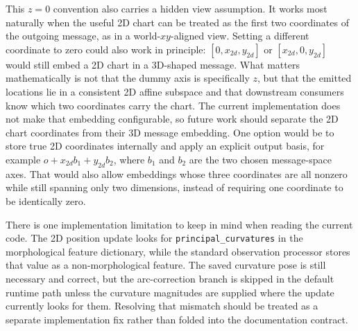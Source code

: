 \documentclass{article}
\begin{document}
This \(z=0\) convention also carries a hidden view assumption.
It works most naturally when the useful 2D chart can be treated as the first two coordinates of the outgoing message, as in a world-\(xy\)-aligned view.
Setting a different coordinate to zero could also work in principle: \([0, x_{2d}, y_{2d}]\) or \([x_{2d}, 0, y_{2d}]\) would still embed a 2D chart in a 3D-shaped message.
What matters mathematically is not that the dummy axis is specifically \(z\), but that the emitted locations lie in a consistent 2D affine subspace and that downstream consumers know which two coordinates carry the chart.
The current implementation does not make that embedding configurable, so future work should separate the 2D chart coordinates from their 3D message embedding.
One option would be to store true 2D coordinates internally and apply an explicit output basis, for example \(o + x_{2d} b_1 + y_{2d} b_2\), where \(b_1\) and \(b_2\) are the two chosen message-space axes.
That would also allow embeddings whose three coordinates are all nonzero while still spanning only two dimensions, instead of requiring one coordinate to be identically zero.

There is one implementation limitation to keep in mind when reading the current code.
The 2D position update looks for \texttt{principal\_curvatures} in the morphological feature dictionary, while the standard observation processor stores that value as a non-morphological feature.
The saved curvature pose is still necessary and correct, but the arc-correction branch is skipped in the default runtime path unless the curvature magnitudes are supplied where the update currently looks for them.
Resolving that mismatch should be treated as a separate implementation fix rather than folded into the documentation contract.



\end{document}
